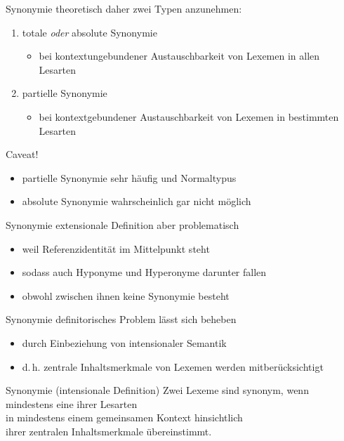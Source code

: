 \begin{frame}{Synonymie}
\onslide<+->
theoretisch daher zwei Typen anzunehmen:
\Halbzeile
\begin{enumerate}[<+->]
	\item		totale \textit{oder} absolute Synonymie
	\begin{itemize}[<+->]
		\item		bei kontextungebundener Austauschbarkeit von Lexemen in allen Lesarten
	\end{itemize}
      \Halbzeile	
      \item		partielle Synonymie
	\begin{itemize}[<+->]
		\item		bei kontextgebundener Austauschbarkeit von Lexemen in bestimmten Lesarten
	\end{itemize}
\end{enumerate}
\onslide<+->
\Zeile
\begin{block}{Caveat!}
\begin{itemize}[<+->]
	\item		partielle Synonymie sehr häufig und Normaltypus 
	\item		absolute Synonymie wahrscheinlich gar nicht möglich
\end{itemize}
\end{block}
\end{frame}

\begin{frame}{Synonymie}
\onslide<+->
extensionale Definition aber problematisch
\Halbzeile
\begin{itemize}[<+->]
	\item		weil Referenzidentität im Mittelpunkt steht
	\item		sodass auch Hyponyme und Hyperonyme darunter fallen
	\item		obwohl zwischen ihnen keine Synonymie besteht
\end{itemize}
\onslide<+->
\Zeile
\begin{exe}
\end{exe}
\end{frame}

\begin{frame}{Synonymie}
\onslide<+->
definitorisches Problem lässt sich beheben
\Halbzeile
\begin{itemize}[<+->]
	\item		durch Einbeziehung von intensionaler Semantik
	\item		d.\,h. zentrale Inhaltsmerkmale von Lexemen werden mitberücksichtigt
\end{itemize}
\onslide<+->
\Zeile
\begin{block}{Synonymie (intensionale Definition)}
  Zwei Lexeme sind synonym, wenn mindestens \alert{eine} ihrer Lesarten\\
  in mindestens \alert{einem} gemeinsamen Kontext hinsichtlich\\
  ihrer zentralen Inhaltsmerkmale übereinstimmt. \citep[67 (modifiziert)]{Harm2015}
\end{block}
\end{frame}

